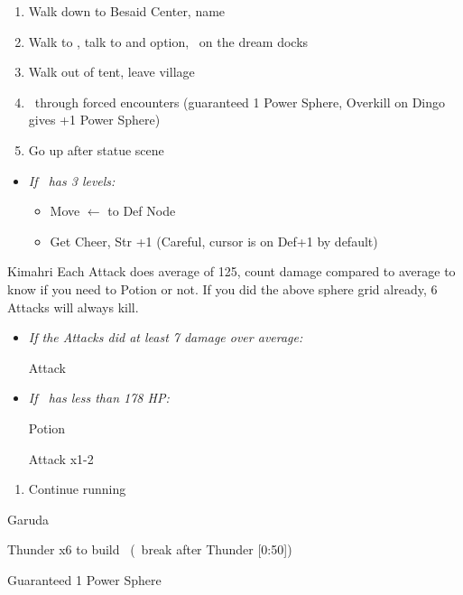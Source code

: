 \begin{enumerate}[resume]
    \item Walk down to Besaid Center, name \valefor
    \item Walk to \yuna, talk to \wakka and  option, \sd\ on the dream docks
    \item Walk out of tent, leave village
    \item \turbo\ through forced encounters (guaranteed 1 Power Sphere, Overkill on Dingo gives +1 Power Sphere)
    \item Go up after statue scene
\end{enumerate}
\begin{spheregrid}
    \begin{itemize}
        \item \textit{If \tidus\ has 3 levels:}
        \begin{itemize}
            \item Move $\leftarrow$ to Def Node
            \item Get Cheer, Str +1 (Careful, cursor is on Def+1 by default)
        \end{itemize}
    \end{itemize}
\end{spheregrid}
\begin{battle}[750]{Kimahri}
    Each Attack does average of 125, count damage compared to average to know if you need to Potion or not.
    If you did the above sphere grid already, 6 Attacks will always kill.
    \begin{itemize}
        \tidusf Attack x5 (hold \turbo)
        \item \textit{If the Attacks did at least 7 damage over average:}
        \begin{itemize}
            \tidusf Attack
        \end{itemize}
        \item \textit{If \tidus\ has less than 178 HP:}
        \begin{itemize}
            \tidusf Potion
        \end{itemize}
        \tidusf Attack x1-2
    \end{itemize}
\end{battle}
\begin{enumerate}[resume]
    \item Continue running
\end{enumerate}
\begin{battle}{Garuda}
    \begin{itemize}
        \summon{\valefor}
        \valeforf Thunder x6 to build \od\ (\turbo\ break after Thunder [0:50])
    \end{itemize}
    Guaranteed 1 Power Sphere
\end{battle}
